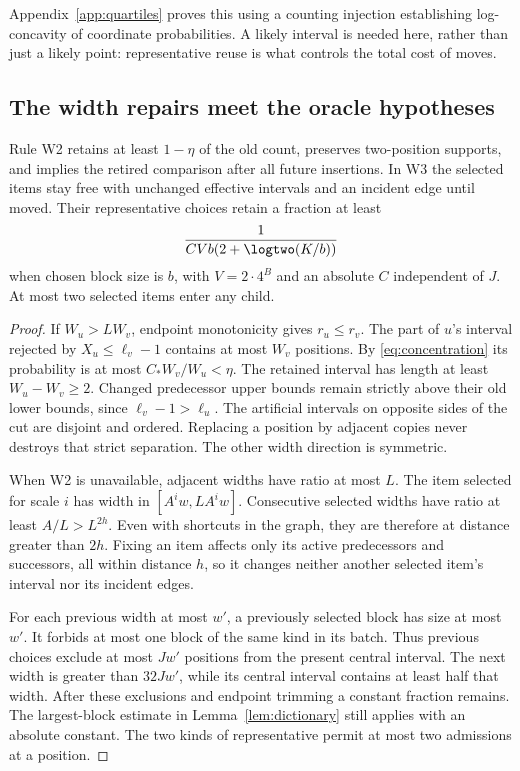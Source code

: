 Appendix~\ref{app:quartiles} proves this using a counting injection establishing
log-concavity of coordinate probabilities. A likely interval is needed here,
rather than just a likely point: representative reuse is what controls the
total cost of moves.

\subsection{The width repairs meet the oracle hypotheses}

\begin{lemma}
\label{lem:width-repairs}
Rule W2 retains at least $1-\eta$ of the old count, preserves two-position
supports, and implies the retired comparison after all future insertions.
In W3 the selected items stay free with unchanged effective intervals and
an incident edge until moved. Their representative choices retain a fraction
at least
\begin{equation}
                   \frac{1}{CVb(2+\logtwo(K/b))}
\label{eq:representative-cost}
\end{equation}
when chosen block size is $b$, with $V=2\cdot4^B$ and an absolute $C$
independent of $J$. At most two selected items enter any child.
\end{lemma}
\begin{proof}
If $W_u>LW_v$, endpoint monotonicity gives $r_u\leq r_v$.
The part of $u$'s interval rejected by $X_u\leq\ell_v-1$ contains at
most $W_v$ positions. By \eqref{eq:concentration} its probability is at most
$C_*W_v/W_u<\eta$. The retained interval has length at least
$W_u-W_v\geq2$. Changed predecessor upper bounds remain strictly above
their old lower bounds, since $\ell_v-1>\ell_u$.
The artificial intervals on opposite sides of the cut are disjoint and
ordered. Replacing a position by adjacent copies never destroys that strict
separation. The other width direction is symmetric.

When W2 is unavailable, adjacent widths have ratio at most $L$.
The item selected for scale $i$ has width in $[A^iw,LA^iw]$.
Consecutive selected widths have ratio at least $A/L>L^{2h}$.
Even with shortcuts in the graph, they are therefore at distance greater
than $2h$. Fixing an item affects only its active predecessors and
successors, all within distance $h$, so it changes neither another selected
item's interval nor its incident edges.

For each previous width at most $w'$, a previously selected block has size
at most $w'$. It forbids at most one block of the same kind in its batch.
Thus previous choices exclude at most $Jw'$ positions from the present
central interval. The next width is greater than $32Jw'$, while its central
interval contains at least half that width. After these exclusions and
endpoint trimming a constant fraction remains. The largest-block estimate
in Lemma~\ref{lem:dictionary} still applies with an absolute constant.
The two kinds of representative permit at most two admissions at a position.
\end{proof}

